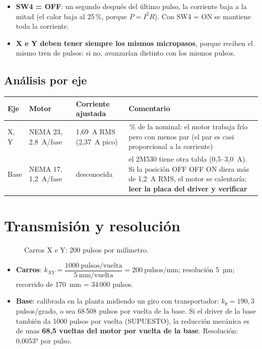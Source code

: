 \begin{itemize}
\item \textbf{SW4 = OFF}: un segundo después del último pulso, la corriente baja a la mitad (el calor baja al 25\,\%, porque $P = I^2R$). Con SW4 = ON se mantiene toda la corriente.
\item \textbf{X e Y deben tener siempre los mismos micropasos}, porque reciben el mismo tren de pulsos: si no, avanzarían distinto con los mismos pulsos.
\end{itemize}

\subsection{Análisis por eje}
\begin{center}\small
\begin{tabularx}{\linewidth}{>{\raggedright}p{2.2cm} >{\raggedright}p{2.6cm} >{\raggedright}p{3cm} >{\raggedright\arraybackslash}X}
\toprule
\textbf{Eje} & \textbf{Motor} & \textbf{Corriente ajustada} & \textbf{Comentario}\\
\midrule
X, Y & NEMA 23, 2,8~A/fase & 1,69~A RMS (2,37~A pico) & 60\,\% de la nominal: el motor trabaja frío pero con menos par (el par es casi proporcional a la corriente)\\
Base & NEMA 17, 1,2~A/fase & desconocida & el 2M530 tiene otra tabla (0,5--3,0~A). Si la posición OFF OFF ON diera más de 1,2~A RMS, el motor se calentaría: \textbf{leer la placa del driver y verificar}\\
\bottomrule
\end{tabularx}
\end{center}

\section{Transmisión y resolución}
\begin{figure}[H]
\centering
{}
\caption{Carros X e Y: 200 pulsos por milímetro.}
\end{figure}

\begin{itemize}
\item \textbf{Carros}: $k_{XY} = \dfrac{1000~\text{pulsos/vuelta}}{5~\text{mm/vuelta}} = 200~\text{pulsos/mm}$; resolución 5~µm; recorrido de 170~mm = 34\,000 pulsos.
\item \textbf{Base}: calibrada en la planta midiendo un giro con transportador: $k_\theta = 190{,}3$ pulsos/grado, o sea 68\,508 pulsos por vuelta de la base. Si el driver de la base también da 1000 pulsos por vuelta (SUPUESTO), la reducción mecánica es de unas \textbf{68,5 vueltas del motor por vuelta de la base}. Resolución: 0,0053° por pulso.
\end{itemize}

